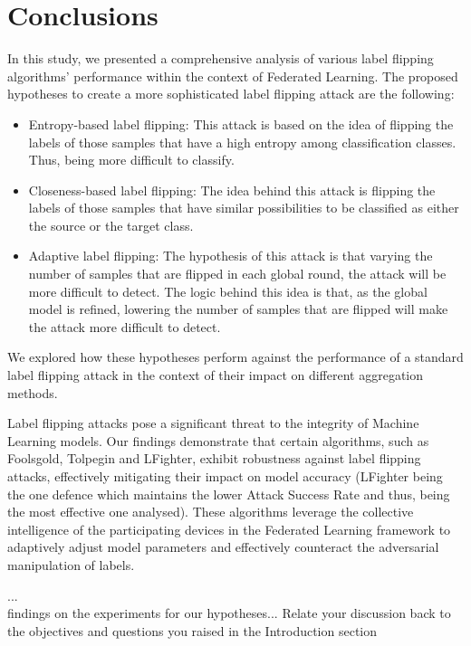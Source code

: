 \newpage
\section{Conclusions}\label{sec:conclusions}
In this study, we presented a comprehensive analysis of various label flipping algorithms' performance within the context of Federated Learning. 
The proposed hypotheses to create a more sophisticated label flipping attack are the following:
\begin{itemize}
        \item Entropy-based label flipping: This attack is based on the idea of flipping the labels of those samples that have a high entropy among classification classes. Thus, being more difficult to classify.
        \item Closeness-based label flipping: The idea behind this attack is flipping the labels of those samples that have similar possibilities to be classified as either the source or the target class.
        \item Adaptive label flipping: The hypothesis of this attack is that varying the number of samples that are flipped in each global round, the attack will be more difficult to detect. The logic behind this idea is that, as the global model is refined, lowering the number of samples that are flipped will make the attack more difficult to detect. 
\end{itemize}

We explored how these hypotheses perform against the performance of a standard label flipping attack in the context of their impact on different aggregation methods.

Label flipping attacks pose a significant threat to the integrity of Machine Learning models. Our findings demonstrate that certain algorithms, such as Foolsgold\cite{FoolsGoldPaper}, Tolpegin\cite{TolpeginPaper} and LFighter\cite{LFighter_paper}, exhibit robustness against label flipping attacks, effectively mitigating their impact on model accuracy (LFighter being the one defence which maintains the lower Attack Success Rate and thus, being the most effective one analysed). These algorithms leverage the collective intelligence of the participating devices in the Federated Learning framework to adaptively adjust model parameters and effectively counteract the adversarial manipulation of labels.

...\\
findings on the experiments for our hypotheses... Relate your discussion back to the objectives and questions you raised
in the Introduction section


